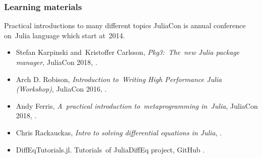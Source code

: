 \documentclass{beamer}  %
\begin{document}
\begin{frame}
  \frametitle{Learning materials}

  \begin{block}{Practical introductions to many different topics}
    JuliaCon is annual conference on~Julia language which start
    at~2014.
    \begin{itemize}
    \item Stefan Karpinski and~Kristoffer Carlsson,
      \emph{Pkg3:~The~new Julia package manager}, JuliaCon 2018,
      .
    \item Arch D. Robison, \emph{Introduction to~Writing High
        Performance Julia (Workshop)}, JuliaCon 2016,
      .
    \item Andy Ferris, \emph{A~practical introduction
        to~metaprogramming in~Julia}, JuliaCon 2018,
      .
    \item Chris Rackauckas, \emph{Intro to solving differential
        equations in Julia},
      .
    \item DiffEqTutorials.jl. Tutorials~of JuliaDiffEq project, GitHub
      .
    \end{itemize}
  \end{block}

\end{frame}
\end{document}
